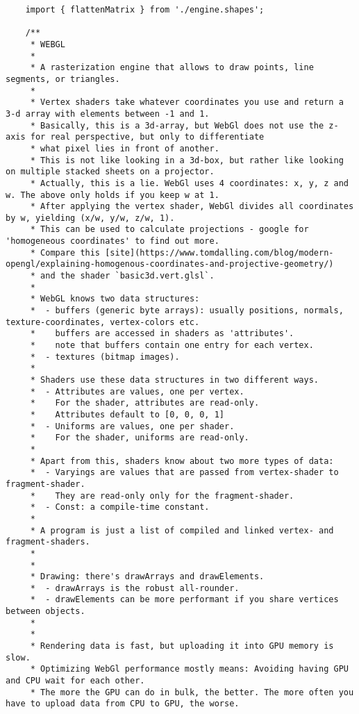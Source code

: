 \begin{lstlisting}
    import { flattenMatrix } from './engine.shapes';

    /**
     * WEBGL
     *
     * A rasterization engine that allows to draw points, line segments, or triangles.
     *
     * Vertex shaders take whatever coordinates you use and return a 3-d array with elements between -1 and 1.
     * Basically, this is a 3d-array, but WebGl does not use the z-axis for real perspective, but only to differentiate
     * what pixel lies in front of another.
     * This is not like looking in a 3d-box, but rather like looking on multiple stacked sheets on a projector.
     * Actually, this is a lie. WebGl uses 4 coordinates: x, y, z and w. The above only holds if you keep w at 1.
     * After applying the vertex shader, WebGl divides all coordinates by w, yielding (x/w, y/w, z/w, 1).
     * This can be used to calculate projections - google for 'homogeneous coordinates' to find out more.
     * Compare this [site](https://www.tomdalling.com/blog/modern-opengl/explaining-homogenous-coordinates-and-projective-geometry/)
     * and the shader `basic3d.vert.glsl`.
     *
     * WebGL knows two data structures:
     *  - buffers (generic byte arrays): usually positions, normals, texture-coordinates, vertex-colors etc.
     *    buffers are accessed in shaders as 'attributes'.
     *    note that buffers contain one entry for each vertex.
     *  - textures (bitmap images).
     *
     * Shaders use these data structures in two different ways.
     *  - Attributes are values, one per vertex.
     *    For the shader, attributes are read-only.
     *    Attributes default to [0, 0, 0, 1]
     *  - Uniforms are values, one per shader.
     *    For the shader, uniforms are read-only.
     *
     * Apart from this, shaders know about two more types of data:
     *  - Varyings are values that are passed from vertex-shader to fragment-shader.
     *    They are read-only only for the fragment-shader.
     *  - Const: a compile-time constant.
     *
     * A program is just a list of compiled and linked vertex- and fragment-shaders.
     *
     *
     * Drawing: there's drawArrays and drawElements.
     *  - drawArrays is the robust all-rounder.
     *  - drawElements can be more performant if you share vertices between objects.
     *
     *
     * Rendering data is fast, but uploading it into GPU memory is slow.
     * Optimizing WebGl performance mostly means: Avoiding having GPU and CPU wait for each other.
     * The more the GPU can do in bulk, the better. The more often you have to upload data from CPU to GPU, the worse.

\end{lstlisting}
